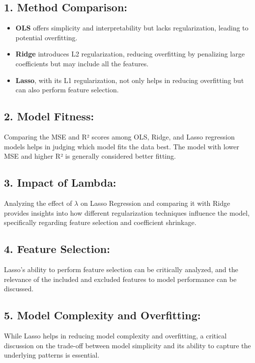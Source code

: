 \documentclass{article}
\begin{document}
\subsection*{1. Method Comparison:}
\begin{itemize}[label={--}]
    \item \textbf{OLS} offers simplicity and interpretability but lacks regularization, leading to potential overfitting.
    \item \textbf{Ridge} introduces L2 regularization, reducing overfitting by penalizing large coefficients but may include all the features.
    \item \textbf{Lasso}, with its L1 regularization, not only helps in reducing overfitting but can also perform feature selection.
\end{itemize}

\subsection*{2. Model Fitness:}
Comparing the MSE and R² scores among OLS, Ridge, and Lasso regression models helps in judging which model fits the data best. The model with lower MSE and higher R² is generally considered better fitting.

\subsection*{3. Impact of Lambda:}
Analyzing the effect of $\lambda$ on Lasso Regression and comparing it with Ridge provides insights into how different regularization techniques influence the model, specifically regarding feature selection and coefficient shrinkage.

\subsection*{4. Feature Selection:}
Lasso’s ability to perform feature selection can be critically analyzed, and the relevance of the included and excluded features to model performance can be discussed.

\subsection*{5. Model Complexity and Overfitting:}
While Lasso helps in reducing model complexity and overfitting, a critical discussion on the trade-off between model simplicity and its ability to capture the underlying patterns is essential.
\end{document}
